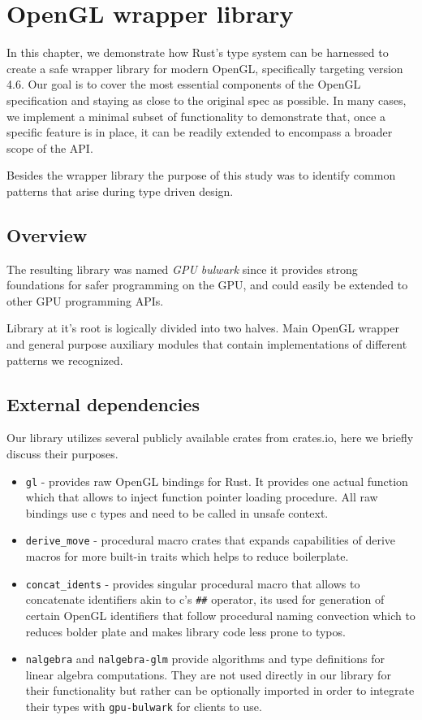 \chapter{OpenGL wrapper library}

In this chapter, we demonstrate how Rust's type system can be harnessed to create a safe wrapper library for modern OpenGL, specifically targeting version 4.6. Our goal is to cover the most essential components of the OpenGL specification and staying as close to the original spec as possible. 
In many cases, we implement a minimal subset of functionality to demonstrate that, once a specific feature is in place, it can be readily extended to encompass a broader scope of the API.

Besides the wrapper library the purpose of this study was to identify common patterns that arise during type driven design.

\section*{Overview}

The resulting library was named \textit{GPU bulwark} since it provides strong foundations for safer programming on the GPU, and could easily be extended to other GPU programming APIs.

Library at it's root is logically divided into two halves. Main OpenGL wrapper and general purpose auxiliary modules that contain implementations of different patterns we recognized.

\section{External dependencies}

Our library utilizes several publicly available crates from crates.io, here we briefly discuss their purposes.

\begin{itemize}
    \item \texttt{gl} - provides raw OpenGL bindings for Rust. It provides one actual function which that allows to inject function pointer loading procedure. All raw bindings use c types and need to be called in unsafe context.
    \item \texttt{derive\_move} - procedural macro crates that expands capabilities of derive macros for more built-in traits which helps to reduce boilerplate.
    \item \texttt{concat\_idents} - provides singular procedural macro that allows to concatenate identifiers akin to c's \texttt{\#\#} operator, its used for generation of certain OpenGL identifiers that follow procedural naming convection which to reduces bolder plate and makes library code less prone to typos.
    \item \texttt{nalgebra} and \texttt{nalgebra-glm} provide algorithms and type definitions for linear algebra computations. They are not used directly in our library for their functionality but rather can be optionally imported in order to integrate their types with \texttt{gpu-bulwark} for clients to use.
\end{itemize}

